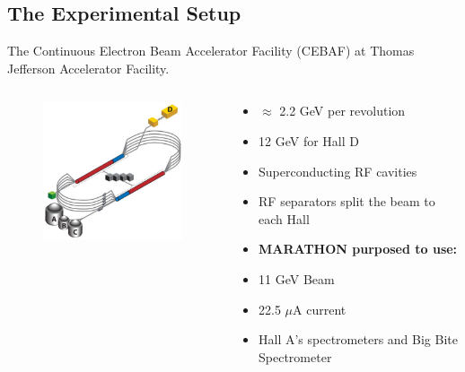 \documentclass[12pt]{beamer}
\begin{document}
\subsection[Equipment]{The Experimental Setup}

\begin{frame}
The Continuous Electron Beam Accelerator Facility (CEBAF) at Thomas Jefferson Accelerator Facility.\\

\vspace{-10pt}
\begin{columns}[c]
		\begin{figure}
			\includegraphics[width=5.5cm]{../images/cebaf.pdf}
		\end{figure}
		\begin{block}{}
			\begin{itemize}
				\addtolength{\itemindent}{-1em}
				\item $\approx$ 2.2 GeV per revolution
				\item 12 GeV for Hall D
				\item Superconducting RF cavities
				\item RF separators split the beam to each Hall
				\item [] \textbf{MARATHON purposed to use:}
				\item 11 GeV Beam	
				\item 22.5 $\mu$A current
				\item Hall A's spectrometers and Big Bite Spectrometer
			\end{itemize}
		\end{block}
\end{columns}
\end{frame}
\end{document}
